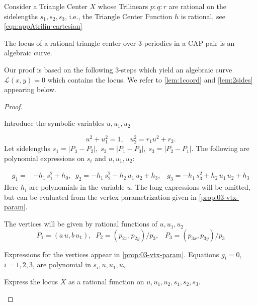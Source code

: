 


Consider a Triangle Center $X$ whose Trilinears $p:q:r$ are rational on the sidelengths $s_1,s_2,s_3$, i.e., the Triangle Center Function $h$ is rational, see  
\cref{eqn:appAtrilin-cartesian}

\begin{theorem}
The locus of a rational triangle center
over 3-periodics in a CAP pair is an algebraic curve.
\label{thm:04-rational-center}
\end{theorem}

Our proof is based on the following 3-steps which yield an algebraic curve $\mathcal{L}(x,y)=0$ which contains the locus. We refer to \cref{lem:1coord} and \cref{lem:2sides} appearing below. %

\begin{proof}

		
\begin{step}

 
Introduce the symbolic variables $u, u_1, u_2$
 
\begin{equation*}
    u^2 + u_1^2 = 1,\;\;\;   u_2^2 = r_1u^2+r_2.
\end{equation*} %
Let sidelengths $s_1=|P_3-P_2|,\; s_2=|P_1-P_3|,\;s_3=|P_2-P_1|$. The following are polynomial expressions on $s_i$ and $u,u_1,u_2$:


	\begin{align*}
		g_1=&    -h_1 \, s_1^2 
		+h_0,\;\;g_2=- h_1\, s_2^2 -
		h_2 \,u_1 \,u_2 +h_3,\;\;\;g_3=- h_1 \,s_3^2 + h_2\,  u_1\, u_2+h_3\end{align*}
Here $h_i$ are polynomials in the variable $u$.	The long expressions will be 
omitted, but can be evaluated from the vertex parametrization given in \cref{prop:03-vtx-param}.	
\end{step}
 
\noindent The vertices will be given by rational functions of   $u, u_1, u_2$ 
\begin{equation*} P_1 = (a\,u, b\,u_1),\;\;P_2 = (p_{2x}, p_{2y})/p_3,\;\;\;P_3 = (p_{3x}, p_{3y})/p_3 
\end{equation*}
 
\noindent Expressions for the vertices appear in \cref{prop:03-vtx-param}. Equations $g_i=0$, $i=1,2,3$, are polynomial in $ s_i,u,u_1,u_2$.
 
\begin{step} Express the locus  $X$ as a  rational function on  $u,u_1, u_2, s_1, s_2, s_3$.
\end{step}


\end{proof}
